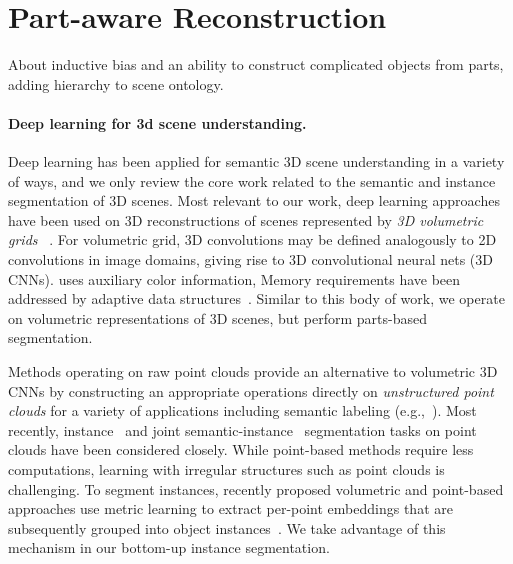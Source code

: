 \section{Part-aware Reconstruction}
\label{sec:part_reconstruction}

About inductive bias and an ability to construct complicated objects from parts, adding hierarchy to scene ontology.

\paragraph{Deep learning for 3d scene understanding.}
\label{related:scene-understanding}
Deep learning has been applied for semantic 3D scene understanding in a variety of ways, and we only review the core work related to the semantic and instance segmentation of 3D scenes. 
Most relevant to our work, deep learning approaches have been used on 3D reconstructions of scenes represented by \emph{3D volumetric grids} ~\cite{dai2017scannet,dai20183dmv,hou20193d,liu2019masc}. For volumetric grid, 3D convolutions may be defined analogously to 2D convolutions in image domains, giving rise to 3D convolutional neural nets (3D CNNs).
\cite{dai20183dmv} uses auxiliary color information, 
Memory requirements have been addressed by adaptive data structures~\cite{wang2017cnn}.
Similar to this body of work, we operate on volumetric representations of 3D scenes, but perform parts-based segmentation. %

Methods operating on raw point clouds provide an alternative to volumetric 3D CNNs by constructing an appropriate operations directly on \emph{unstructured point clouds} for a variety of applications including semantic labeling (e.g.,~\cite{qi2017pointnet,qi2017pointnet++,klokov2017escape,wang2018sgpn,wang2019dynamic}). Most recently, instance~\cite{elich20193d,liang20193d,elich20193d,yi2019gspn,yang2019learning,zhang2019point,engelmann20203d} and joint semantic-instance~\cite{wang2019associatively,pham2019jsis3d} segmentation tasks on point clouds have been considered closely. While point-based methods require less computations, learning with irregular structures such as point clouds is challenging.
To segment instances, recently proposed volumetric and point-based approaches use metric learning  to extract per-point embeddings that are subsequently grouped into object instances~\cite{elich20193d,yi2019gspn,lahoud20193d,liu2019masc}. We take advantage of this mechanism in our bottom-up instance segmentation.

